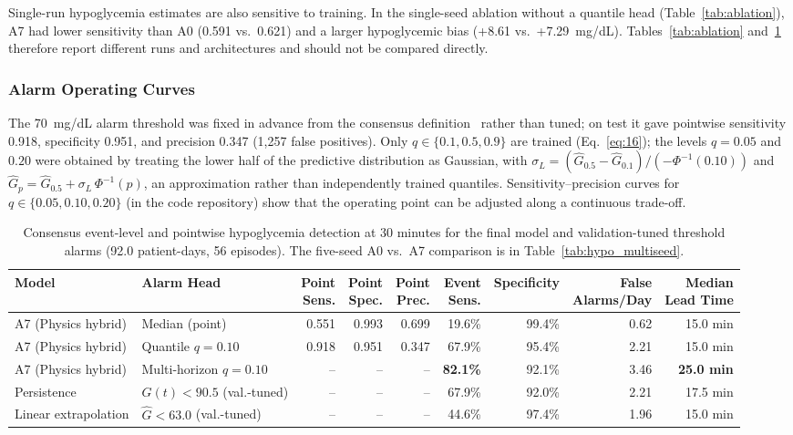 \documentclass[journal]{IEEEtran}
\begin{document}
Single-run hypoglycemia estimates are also sensitive to training. In the single-seed ablation without a quantile head (Table~\ref{tab:ablation}), A7 had lower sensitivity than A0 (0.591 vs.\ 0.621) and a larger hypoglycemic bias (+8.61 vs.\ +7.29~mg/dL). Tables~\ref{tab:ablation} and~\ref{tab:hypo_event} therefore report different runs and architectures and should not be compared directly.

\subsubsection{Alarm Operating Curves}
\label{sec:validation_threshold_selection}
The 70~mg/dL alarm threshold was fixed in advance from the consensus definition~\cite{ref52} rather than tuned; on test it gave pointwise sensitivity 0.918, specificity 0.951, and precision 0.347 (1,257 false positives). Only $q \in \{0.1, 0.5, 0.9\}$ are trained (Eq.~\eqref{eq:16}); the levels $q = 0.05$ and $0.20$ were obtained by treating the lower half of the predictive distribution as Gaussian, with $\sigma_L = (\hat{G}_{0.5} - \hat{G}_{0.1})/(-\Phi^{-1}(0.10))$ and $\hat{G}_p = \hat{G}_{0.5} + \sigma_L\,\Phi^{-1}(p)$, an approximation rather than independently trained quantiles. Sensitivity--precision curves for $q \in \{0.05, 0.10, 0.20\}$ (in the code repository) show that the operating point can be adjusted along a continuous trade-off.

\begin{table}[t]
\centering
\caption{Consensus event-level and pointwise hypoglycemia detection at 30 minutes for the final model and validation-tuned threshold alarms (92.0 patient-days, 56 episodes). The five-seed A0 vs.\ A7 comparison is in Table~\ref{tab:hypo_multiseed}.}
\label{tab:hypo_event}
\footnotesize
\begin{tabular}{llrrrrrrr}
\toprule
Model & Alarm Head & \makecell{Point\\Sens.} & \makecell{Point\\Spec.} & \makecell{Point\\Prec.} & \makecell{Event\\Sens.} & Specificity & \makecell{False\\Alarms/Day} & \makecell{Median\\Lead Time} \\
\midrule
A7 (Physics hybrid) & Median (point) & 0.551 & 0.993 & 0.699 & 19.6\% & 99.4\% & 0.62 & 15.0 min \\
A7 (Physics hybrid) & Quantile $q=0.10$ & 0.918 & 0.951 & 0.347 & 67.9\% & 95.4\% & 2.21 & 15.0 min \\
A7 (Physics hybrid) & Multi-horizon $q=0.10$ & -- & -- & -- & \textbf{82.1\%} & 92.1\% & 3.46 & \textbf{25.0 min} \\
\midrule
Persistence & $G(t) < 90.5$ (val.-tuned) & -- & -- & -- & 67.9\% & 92.0\% & 2.21 & 17.5 min \\
Linear extrapolation & $\hat{G} < 63.0$ (val.-tuned) & -- & -- & -- & 44.6\% & 97.4\% & 1.96 & 15.0 min \\
\bottomrule
\end{tabular}
\end{table}
\end{document}
